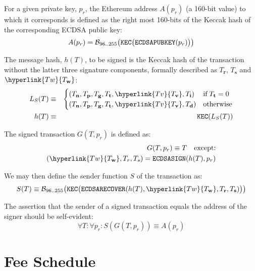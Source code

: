 \documentclass[9pt,oneside]{amsart}
\begin{document}
For a given private key, $p_r$, the Ethereum address $A(p_r)$ (a 160-bit value) to which it corresponds is defined as the right most 160-bits of the Keccak hash of the corresponding ECDSA public key:
\begin{equation}
A(p_r) = \mathcal{B}_{96..255}\big(\mathtt{\tiny KEC}\big( \mathtt{\small ECDSAPUBKEY}(p_r) \big) \big)
\end{equation}

The message hash, $h(T)$, to be signed is the Keccak hash of the transaction without the latter three signature components, formally described as $T_\mathbf{r}$, $T_\mathbf{s}$ and $\hyperlink{T w}{T_\mathbf{w}}$:
\begin{eqnarray}
L_S(T) & \equiv & \begin{cases}
(T_\mathbf{n}, T_\mathbf{p}, T_\mathbf{g}, T_\mathbf{t}, \hyperlink{T v}{T_\mathbf{v}}, T_\mathbf{i}) & \text{if} \; T_\mathbf{t} = 0\\
(T_\mathbf{n}, T_\mathbf{p}, T_\mathbf{g}, T_\mathbf{t}, \hyperlink{T v}{T_\mathbf{v}}, T_\mathbf{d}) & \text{otherwise}
\end{cases} \\
h(T) & \equiv & \mathtt{\small KEC}( L_S(T) )
\end{eqnarray}

\hypertarget{T w}{}\hypertarget{T r}{}\hypertarget{T s}{The signed transaction $G(T, p_r)$ is defined as:
\begin{eqnarray}
G(T, p_r) \equiv T \quad \text{except:} \\
(\hyperlink{T w}{T_\mathbf{w}}, T_r, T_s) = \mathtt{\small ECDSASIGN}(h(T), p_r)
\end{eqnarray}}

We may then define the sender function $S$ of the transaction as:
\begin{equation}
S(T) \equiv \mathcal{B}_{96..255}\big(\mathtt{\tiny KEC}\big( \mathtt{\small ECDSARECOVER}(h(T), \hyperlink{T w}{T_\mathbf{w}}, T_\mathbf{r}, T_\mathbf{s}) \big) \big)
\end{equation}

The assertion that the sender of a signed transaction equals the address of the signer should be self-evident:
\begin{equation}
\forall T: \forall p_r: S(G(T, p_r)) \equiv A(p_r)
\end{equation}

\newpage
\section{Fee Schedule}\label{app:fees}
\end{document}
